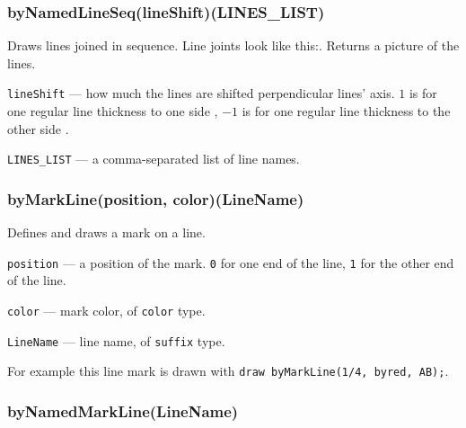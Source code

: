 \documentclass{ltxdoc}
\begin{document}
\subsubsection{byNamedLineSeq(lineShift)(LINES\_LIST)}\label{byNamedLineSeq}

		
	Draws lines joined in sequence. Line joints look like this:\drawCurrentPicture. Returns a picture of the lines.
	
	\texttt{lineShift} — how much the lines are shifted perpendicular lines' axis. \texttt{$1$} is for one regular line thickness to one side%
	, 
	\texttt{$-1$} is for one regular line thickness to the other side%
	.
	
	\texttt{LINES\_LIST} — a comma-separated list of line names.
	

\subsubsection{byMarkLine(position, color)(LineName)}\label{byMarkLine}

	
	Defines and draws a mark on a line.
	
	\texttt{position} — a position of the mark. \texttt{0} for one end of the line, \texttt{1} for the other end of the line.
	
	\texttt{color} — mark color, of \texttt{color} type.
	
	\texttt{LineName} — line name, of \texttt{suffix} type.
	
	For example this line mark  is drawn with \texttt{draw byMarkLine(1/4, byred, AB);}.

\subsubsection{byNamedMarkLine(LineName)}
\end{document}
